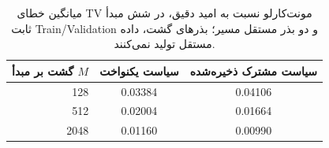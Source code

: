 \begin{table}[htbp]
\centering\small
\caption{میانگین خطای TV مونت‌کارلو نسبت به امید دقیق، در شش مبدأ ثابت Train/Validation و دو بذر مستقل مسیر؛ بذرهای گشت، داده مستقل تولید نمی‌کنند.}
\label{tab:ch4-matrix-mc-check}
\begin{tabular}{rcc}\hline
گشت بر مبدأ $M$ & سیاست یکنواخت & سیاست مشترک ذخیره‌شده\\\hline
128 & 0.03384 & 0.04106\\
512 & 0.02004 & 0.01664\\
2048 & 0.01160 & 0.00990\\
\hline
\end{tabular}
\end{table}
